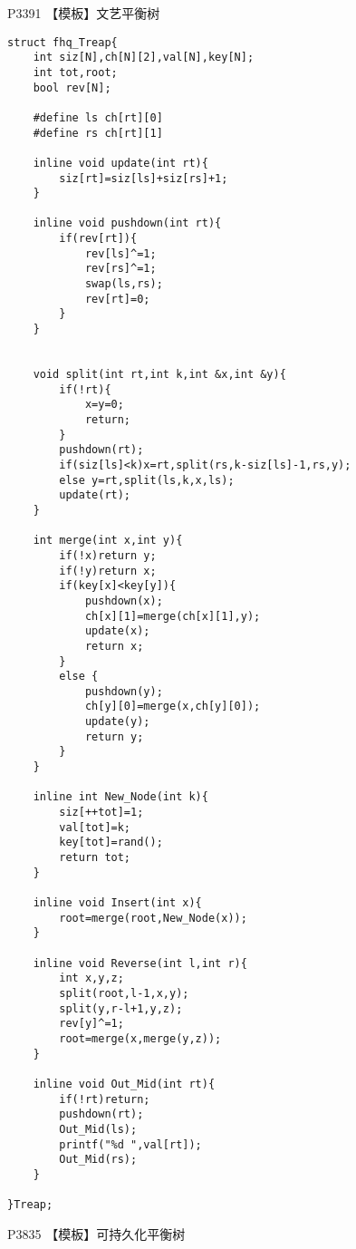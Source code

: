 \documentclass{ctexart}
\begin{document}
P3391 【模板】文艺平衡树
\begin{lstlisting}
struct fhq_Treap{
    int siz[N],ch[N][2],val[N],key[N];
    int tot,root;
    bool rev[N];
    
    #define ls ch[rt][0]
    #define rs ch[rt][1]
    
    inline void update(int rt){
        siz[rt]=siz[ls]+siz[rs]+1;
    }
    
    inline void pushdown(int rt){
        if(rev[rt]){
            rev[ls]^=1;
            rev[rs]^=1;
            swap(ls,rs);
            rev[rt]=0;
        }
    }
        
    
    void split(int rt,int k,int &x,int &y){
        if(!rt){
            x=y=0;
            return;
        }
        pushdown(rt);
        if(siz[ls]<k)x=rt,split(rs,k-siz[ls]-1,rs,y);
        else y=rt,split(ls,k,x,ls);
        update(rt);
    }
    
    int merge(int x,int y){
        if(!x)return y;
        if(!y)return x;
        if(key[x]<key[y]){
            pushdown(x);
            ch[x][1]=merge(ch[x][1],y);
            update(x);
            return x;
        }
        else {
            pushdown(y);
            ch[y][0]=merge(x,ch[y][0]);
            update(y);
            return y;
        }
    }
    
    inline int New_Node(int k){
        siz[++tot]=1;
        val[tot]=k;
        key[tot]=rand();
        return tot;
    }
    
    inline void Insert(int x){
        root=merge(root,New_Node(x));
    }
    
    inline void Reverse(int l,int r){
        int x,y,z;
        split(root,l-1,x,y);
        split(y,r-l+1,y,z);
        rev[y]^=1;
        root=merge(x,merge(y,z));
    }
    
    inline void Out_Mid(int rt){
        if(!rt)return;
        pushdown(rt);
        Out_Mid(ls);
        printf("%d ",val[rt]);
        Out_Mid(rs);
    }
    
}Treap;
\end{lstlisting}
P3835 【模板】可持久化平衡树
\end{document}
